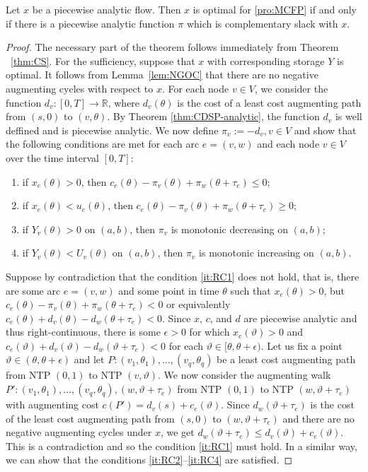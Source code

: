 \documentclass{svjour3}                     \smartqed
\newcommand{\rr}{\ensuremath{\mathbb{R}}}
\begin{document}
\begin{theorem}
\label{thm:RC}
Let $x$ be a piecewise analytic flow.
Then $x$ is optimal for \eqref{pro:MCFP} if and only if there is a piecewise analytic function $\pi$ which is complementary slack with $x$.
\end{theorem}
\begin{proof}
The necessary part of the theorem follows immediately from Theorem ~\ref{thm:CS}. For the sufficiency, suppose that $x$ with corresponding storage $Y$ is optimal. It follows from Lemma~\ref{lem:NGOC} that there are no negative augmenting cycles with respect to $x$. For each node $v\in V$, we consider the function $d_v:[0,T]\rightarrow \rr$, where $d_v(\theta)$ is the cost of a least cost augmenting path from $(s,0)$ to $(v,\theta)$. By Theorem \ref{thm:CDSP-analytic}, the function $d_v$ is well deffined and is piecewise analytic. We now define $\pi_v:=-d_v, v\in V$ and show that the following conditions are met for each arc $e=(v,w)$ and each node $v\in V$ over the time interval $[0,T]$:
\begin{enumerate}[label = (RC\arabic*), leftmargin = *]
\item\label{it:RC1} if $x_e(\theta)>0$, then $c_{e}(\theta)-\pi_v(\theta)+\pi_w(\theta+\tau_e)\leq 0$;
\item\label{it:RC2} if $x_e(\theta)<u_{e}(\theta)$, then $c_{e}(\theta)-\pi_v(\theta)+\pi_w(\theta+\tau_e)\geq 0$;
\item\label{it:RC3} if $Y_v(\theta)>0$ on $(a,b)$, then $\pi_v$ is monotonic decreasing on $(a,b)$;
\item\label{it:RC4} if $Y_v(\theta)<U_v(\theta)$ on $(a,b)$, then $\pi_v$ is monotonic increasing on $(a,b)$.
\end{enumerate}
Suppose by contradiction that the condition \ref{it:RC1} does not hold, that is, there are some arc $e=(v,w)$ and some point in time $\theta$ such that $x_e(\theta)>0$, but $c_{e}(\theta)-\pi_v(\theta)+\pi_w(\theta+\tau_e)<0$ or equivalently $c_{e}(\theta)+d_v(\theta)-d_w(\theta+\tau_e)<0$. Since $x$, $c$, and $d$ are piecewise analytic and thus right-continuous, there is some $\epsilon>0$ for which $x_{e}(\vartheta)>0$ and $c_{e}(\vartheta)+d_v(\vartheta)-d_w(\vartheta+\tau_e)<0$ for each $\vartheta\in [\theta,\theta+\epsilon)$. Let us fix a point $\vartheta\in (\theta,\theta+\epsilon)$ and let $P:(v_1,\theta_1), \ldots, (v_q,\theta_q)$ be a least cost augmenting path from NTP $(0,1)$ to NTP $(v,\vartheta)$. We now consider the augmenting walk $P':(v_1,\theta_1), \ldots, (v_q,\theta_q), (w,\vartheta+\tau_e)$ from NTP $(0,1)$ to NTP $(w,\vartheta+\tau_e)$ with augmenting cost $c(P')=d_v(s)+c_{e}(\vartheta)$. Since $d_w(\vartheta+\tau_e)$ is the cost of the least cost augmenting path from $(s,0)$ to $(w,\vartheta+\tau_e)$ and there are no negative augmenting cycles under $x$, we get $d_w(\vartheta+\tau_e)\leq d_v(\vartheta)+c_{e}(\vartheta)$. This is a contradiction and so the condition \ref{it:RC1} must hold. In a similar way, we can show that the conditions \ref{it:RC2}--\ref{it:RC4} are satisfied.


\end{proof}
\end{document}
